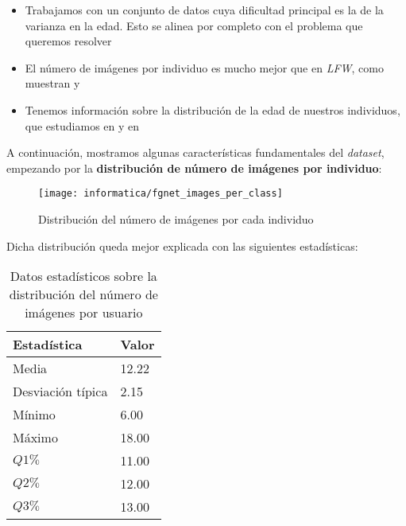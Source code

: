 \begin{itemize}
    \item Trabajamos con un conjunto de datos cuya dificultad principal es la de la varianza en la edad. Esto se alinea por completo con el problema que queremos resolver
    \item El número de imágenes por individuo es mucho mejor que en \textit{LFW}, como muestran  y 
    \item Tenemos información sobre la distribución de la edad de nuestros individuos, que estudiamos en  y en 
\end{itemize}

A continuación, mostramos algunas características fundamentales del \textit{dataset}, empezando por la \textbf{distribución de número de imágenes por individuo}:

\begin{figure}[H]
    \centering
    \texttt{[image: informatica/fgnet\_images\_per\_class]}
    \caption{Distribución del número de imágenes por cada individuo}
    \label{img:fgnet_images_per_class}
\end{figure}

Dicha distribución queda mejor explicada con las siguientes estadísticas:

\begin{table}[H]
\centering
\begin{tabular}{|l|l|}
    \hline
    \textbf{Estadística} & \textbf{Valor} \\
    \hline

    Media             & 12.22 \\
    Desviación típica & 2.15  \\
    Mínimo            & 6.00 \\
    Máximo            & 18.00 \\
    $Q1 \%$           & 11.00 \\
    $Q2 \%$           & 12.00 \\
    $Q3 \%$           & 13.00 \\

    \hline

\end{tabular}
\caption{Datos estadísticos sobre la distribución del número de imágenes por usuario}
\label{table:fgnet_images_per_class}
\end{table}

